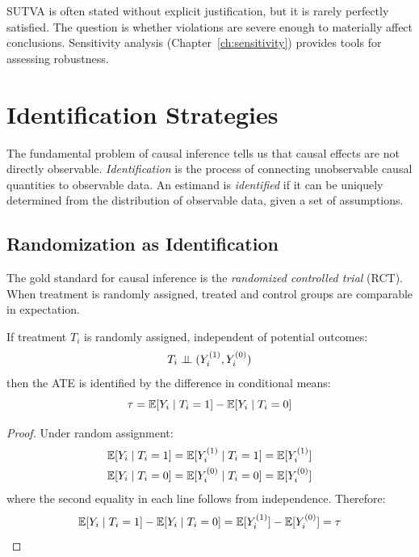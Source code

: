 \begin{remark}
SUTVA is often stated without explicit justification, but it is rarely perfectly satisfied. The question is whether violations are severe enough to materially affect conclusions. Sensitivity analysis (Chapter~\ref{ch:sensitivity}) provides tools for assessing robustness.
\end{remark}


\section{Identification Strategies}
\label{sec:identification}

The fundamental problem of causal inference tells us that causal effects are not directly observable. \emph{Identification} is the process of connecting unobservable causal quantities to observable data. An estimand is \emph{identified} if it can be uniquely determined from the distribution of observable data, given a set of assumptions.

\subsection{Randomization as Identification}

The gold standard for causal inference is the \emph{randomized controlled trial} (RCT). When treatment is randomly assigned, treated and control groups are comparable in expectation.

\begin{theorem}
\label{thm:rct_identification}
If treatment $T_i$ is randomly assigned, independent of potential outcomes:
\begin{equation}
T_i \perp\!\!\!\perp (Y^{(1)}_i, Y^{(0)}_i)
\label{eq:random_assignment}
\end{equation}
then the ATE is identified by the difference in conditional means:
\begin{equation}
\tau = \mathbb{E}[Y_i \mid T_i = 1] - \mathbb{E}[Y_i \mid T_i = 0]
\label{eq:rct_identification}
\end{equation}
\end{theorem}

\begin{proof}
Under random assignment:
\begin{align*}
\mathbb{E}[Y_i \mid T_i = 1] &= \mathbb{E}[Y^{(1)}_i \mid T_i = 1] = \mathbb{E}[Y^{(1)}_i] \\
\mathbb{E}[Y_i \mid T_i = 0] &= \mathbb{E}[Y^{(0)}_i \mid T_i = 0] = \mathbb{E}[Y^{(0)}_i]
\end{align*}
where the second equality in each line follows from independence. Therefore:
\begin{equation*}
\mathbb{E}[Y_i \mid T_i = 1] - \mathbb{E}[Y_i \mid T_i = 0] = \mathbb{E}[Y^{(1)}_i] - \mathbb{E}[Y^{(0)}_i] = \tau
\end{equation*}
\end{proof}

